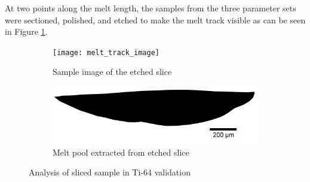 \documentclass[pdflatex,sn-mathphys]{sn-jnl}
\begin{document}
	At two points along the melt length, the samples from the three parameter sets were sectioned, polished, and etched to make the melt track visible as can be seen in Figure \ref{fig:melt_track_image}.  
	\begin{figure}[!htb]
		\centering
			\begin{subfigure}{0.495\textwidth}
			\texttt{[image: melt\_track\_image]}
			\caption{Sample image of the etched slice}
			\label{fig:melt_track_image}
			\end{subfigure}
				\begin{subfigure}{0.495\textwidth}
				\includegraphics[width=\textwidth]{melt_track_bitmap}
				\caption{Melt pool extracted from etched slice}
				\label{fig:melt_track_bitmap}
				\end{subfigure}
		\caption{Analysis of sliced sample in Ti-64 validation}
		\label{fig:melt_track}
	\end{figure}
	
\end{document}
